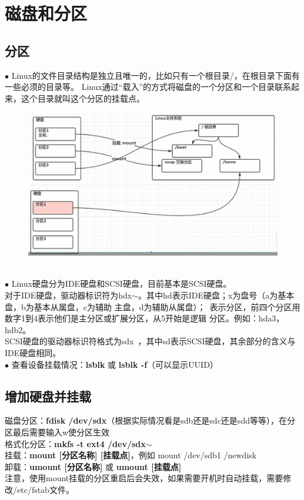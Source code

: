 \documentclass[11pt]{article}
\begin{document}
\section{磁盘和分区}
\subsection{分区}
$\bullet$ Linux的文件目录结构是独立且唯一的，比如只有一个根目录/，在根目录下面有一些必须的目录等。
Linux通过“载入”的方式将磁盘的一个分区和一个目录联系起来，这个目录就叫这个分区的挂载点。 \\
\begin{figure}[htb]
    \centering
    \includegraphics[scale=0.27]{imgs/parts.png}
\end{figure} \\
$\bullet$ Linux硬盘分为IDE硬盘和SCSI硬盘，目前基本是SCSI硬盘。 \\
对于IDE硬盘，驱动器标识符为hdx$\sim$。其中hd表示IDE硬盘；x为盘号（a为基本盘，b为基本从属盘，c为辅助
主盘，d为辅助从属盘）；~表示分区，前四个分区用数字1到4表示他们是主分区或扩展分区，从5开始是逻辑
分区。例如：hda3，hdb2。\\
SCSI硬盘的驱动器标识符格式为sdx~，其中sd表示SCSI硬盘，其余部分的含义与IDE硬盘相同。
\\
$\bullet$ 查看设备挂载情况：\textbf{lsblk} 或 \textbf{lsblk -f}（可以显示UUID）

\subsection{增加硬盘并挂载}
磁盘分区：\textbf{fdisk /dev/sdx}（根据实际情况看是sdb还是sdc还是sdd等等），在分区最后需要输入w使分区生效  \\
格式化分区：\textbf{mkfs -t ext4 /dev/sdx$\sim$}  \\
挂载：\textbf{mount [分区名称] [挂载点]}，例如 mount /dev/sdb1 /newdisk  \\
卸载：\textbf{umount [分区名称]} 或 \textbf{umount [挂载点]}  \\
注意，使用mount挂载的分区重启后会失效，如果需要开机时自动挂载，需要修改/etc/fstab文件。
\end{document}
